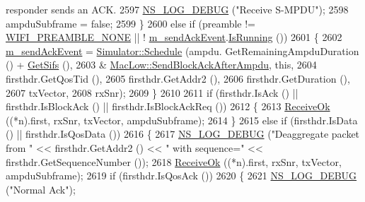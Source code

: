 \begin{DoxyCode}
{       responder sends an ACK.}
2597               \hyperlink{group__logging_ga413f1886406d49f59a6a0a89b77b4d0a}{NS\_LOG\_DEBUG} (\textcolor{stringliteral}{"Receive S-MPDU"});
2598               ampduSubframe = \textcolor{keyword}{false};
2599             \}
2600           \textcolor{keywordflow}{else} \textcolor{keywordflow}{if} (preamble != \hyperlink{group__wifi_gga5e94a56cb338a14ffbbb19c6a41251eba97c5c71995de5f28931200e6d5a38a66}{WIFI\_PREAMBLE\_NONE} || !
      \hyperlink{classns3_1_1MacLow_a35ee7cfc983896c26c514bade14b3197}{m\_sendAckEvent}.\hyperlink{classns3_1_1EventId_aabf8476d1a080c199ea0c6aa9ccea372}{IsRunning} ())
2601             \{
2602               \hyperlink{classns3_1_1MacLow_a35ee7cfc983896c26c514bade14b3197}{m\_sendAckEvent} = \hyperlink{classns3_1_1Simulator_a671882c894a08af4a5e91181bf1eec13}{Simulator::Schedule} (ampdu.
      GetRemainingAmpduDuration () + \hyperlink{classns3_1_1MacLow_a9107421b7ed9f291d60b8344b4918e56}{GetSifs} (),
2603                                                     &
      \hyperlink{classns3_1_1MacLow_af6e2acc771d188c0959871f142912296}{MacLow::SendBlockAckAfterAmpdu}, \textcolor{keyword}{this},
2604                                                     firsthdr.GetQosTid (),
2605                                                     firsthdr.GetAddr2 (),
2606                                                     firsthdr.GetDuration (),
2607                                                     txVector,
2608                                                     rxSnr);
2609             \}
2610 
2611           \textcolor{keywordflow}{if} (firsthdr.IsAck () || firsthdr.IsBlockAck () || firsthdr.IsBlockAckReq ())
2612             \{
2613               \hyperlink{classns3_1_1MacLow_ade59e3a5e41c6ccbafd93501d7e9fbc0}{ReceiveOk} ((*n).first, rxSnr, txVector, ampduSubframe);
2614             \}
2615           \textcolor{keywordflow}{else} \textcolor{keywordflow}{if} (firsthdr.IsData () || firsthdr.IsQosData ())
2616             \{
2617               \hyperlink{group__logging_ga413f1886406d49f59a6a0a89b77b4d0a}{NS\_LOG\_DEBUG} (\textcolor{stringliteral}{"Deaggregate packet from "} << firsthdr.GetAddr2 () << \textcolor{stringliteral}{" with
       sequence="} << firsthdr.GetSequenceNumber ());
2618               \hyperlink{classns3_1_1MacLow_ade59e3a5e41c6ccbafd93501d7e9fbc0}{ReceiveOk} ((*n).first, rxSnr, txVector, ampduSubframe);
2619               \textcolor{keywordflow}{if} (firsthdr.IsQosAck ())
2620                 \{
2621                   \hyperlink{group__logging_ga413f1886406d49f59a6a0a89b77b4d0a}{NS\_LOG\_DEBUG} (\textcolor{stringliteral}{"Normal Ack"});

\end{DoxyCode}
